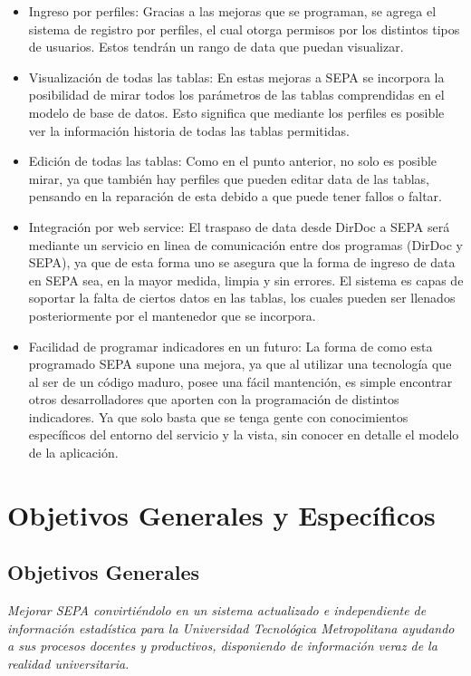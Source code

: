 \documentclass[a4paper,12pt,openany,oneside]{book}
\begin{document}
\begin{itemize}
	\item Ingreso por perfiles: Gracias a las mejoras que se programan, se agrega el sistema de registro por perfiles, el cual otorga permisos por los distintos tipos de usuarios. Estos tendrán un rango de data que puedan visualizar. 
	\item Visualización de todas las tablas: En estas mejoras a SEPA se incorpora la posibilidad de mirar todos los parámetros de las tablas comprendidas en el modelo de base de datos. Esto significa que mediante los perfiles es posible ver la información historia de todas las tablas permitidas.
	\item Edición de todas las tablas: Como en el punto anterior, no solo es posible mirar, ya que también hay perfiles que pueden editar data de las tablas, pensando en la reparación de esta debido a que puede tener fallos o faltar.
	\item Integración por web service: El traspaso de data desde DirDoc a SEPA será mediante un servicio en linea de comunicación entre dos programas (DirDoc y SEPA), ya que de esta forma uno se asegura que la forma de ingreso de data en SEPA sea, en la mayor medida, limpia y sin errores. El sistema es capas de soportar la falta de ciertos datos en las tablas, los cuales pueden ser llenados posteriormente por el mantenedor que se incorpora.
	\item Facilidad de programar indicadores en un futuro: La forma de como esta programado SEPA supone una mejora, ya que al utilizar una tecnología que al ser de un código maduro, posee una fácil mantención, es simple encontrar otros desarrolladores que aporten con la programación de distintos indicadores. Ya que solo basta que se tenga gente con conocimientos específicos del entorno del servicio y la vista, sin conocer en detalle el modelo de la aplicación.
\end{itemize}
\section{Objetivos Generales y Específicos}
\subsection{Objetivos Generales}
\textit{Mejorar SEPA convirtiéndolo en un sistema actualizado e independiente de información estadística para la Universidad Tecnológica Metropolitana ayudando a sus procesos docentes y productivos, disponiendo de información veraz de la realidad universitaria.}
\end{document}

